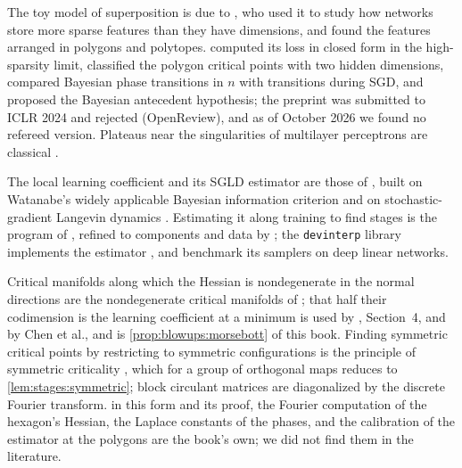 \begin{refsection}
\notesandrefs
The toy model of superposition is due to \textcite{ElhageEtAl2022}, who used it to study how networks store more sparse features than they have dimensions, and found the features arranged in polygons and polytopes. \textcite{ChenEtAl2023} computed its loss in closed form in the high-sparsity limit, classified the polygon critical points with two hidden dimensions, compared Bayesian phase transitions in $n$ with transitions during SGD, and proposed the Bayesian antecedent hypothesis; the preprint was submitted to ICLR 2024 and rejected (OpenReview), and as of October 2026 we found no refereed version. Plateaus near the singularities of multilayer perceptrons are classical \parencite{FukumizuAmari2000,AmariEtAl2006}.

The local learning coefficient and its SGLD estimator are those of \textcite{LauEtAl2025}, built on Watanabe's widely applicable Bayesian information criterion \parencite{Watanabe2013} and on stochastic-gradient Langevin dynamics \parencite{WellingTeh2011}. Estimating it along training to find stages is the program of \textcite{HooglandEtAl2025}, refined to components and data by \textcite{WangEtAl2025a}; the \texttt{devinterp} library implements the estimator \parencite{vanWingerdenEtAl2024}, and \textcite{HitchcockHoogland2025} benchmark its samplers on deep linear networks.

Critical manifolds along which the Hessian is nondegenerate in the normal directions are the nondegenerate critical manifolds of \textcite{Bott1954}; that half their codimension is the learning coefficient at a minimum is used by \textcite{WeiEtAl2023}, Section~4, and by Chen et al., and is \cref{prop:blowups:morsebott} of this book. Finding symmetric critical points by restricting to symmetric configurations is the principle of symmetric criticality \parencite{Palais1979}, which for a group of orthogonal maps reduces to \cref{lem:stages:symmetric}; block circulant matrices are diagonalized by the discrete Fourier transform.  in this form and its proof, the Fourier computation of the hexagon's Hessian, the Laplace constants of the phases, and the calibration of the estimator at the polygons are the book's own; we did not find them in the literature.


\end{refsection}
